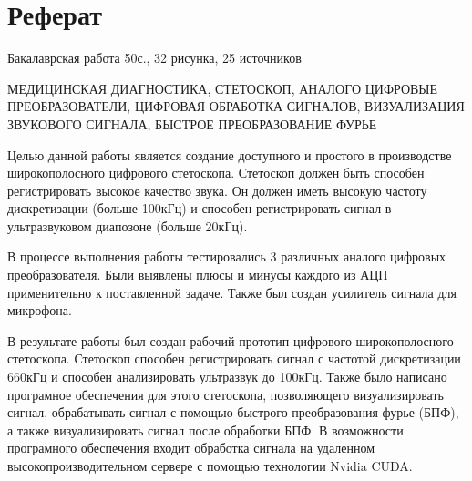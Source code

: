 \documentclass[../main.tex]{subfiles}
\begin{document}
\newpage
\section*{\centering Реферат}

\par\noindent Бакалаврская работа 50с., 32 рисунка, 25 источников

МЕДИЦИНСКАЯ ДИАГНОСТИКА, СТЕТОСКОП, АНАЛОГО ЦИФРОВЫЕ ПРЕОБРАЗОВАТЕЛИ, ЦИФРОВАЯ ОБРАБОТКА СИГНАЛОВ, ВИЗУАЛИЗАЦИЯ ЗВУКОВОГО СИГНАЛА, БЫСТРОЕ ПРЕОБРАЗОВАНИЕ ФУРЬЕ

Целью данной работы является создание доступного и простого в производстве широкополосного цифрового стетоскопа. Стетоскоп должен быть способен регистрировать высокое качество звука. Он должен иметь высокую частоту дискретизации (больше 100кГц) и способен регистрировать сигнал в ультразвуковом диапозоне (больше 20кГц).

В процессе выполнения работы тестировались 3 различных аналого цифровых преобразователя. Были выявлены плюсы и минусы каждого из АЦП применительно к поставленной задаче. Также был создан усилитель сигнала для микрофона.

В результате работы был создан рабочий прототип цифрового широкополосного стетоскопа. Стетоскоп способен регистрировать сигнал с частотой дискретизации 660кГц и способен анализировать ультразвук до 100кГц. Также было написано програмное обеспечения для этого стетоскопа, позволяющего визуализировать сигнал, обрабатывать сигнал с помощью быстрого преобразования фурье (БПФ), а также визуализировать сигнал после обработки БПФ. В возможности програмного обеспечения входит обработка сигнала на удаленном высокопроизводительном сервере с помощью технологии Nvidia CUDA.

\clearpage
\normalsize
\newpage
\end{document}
